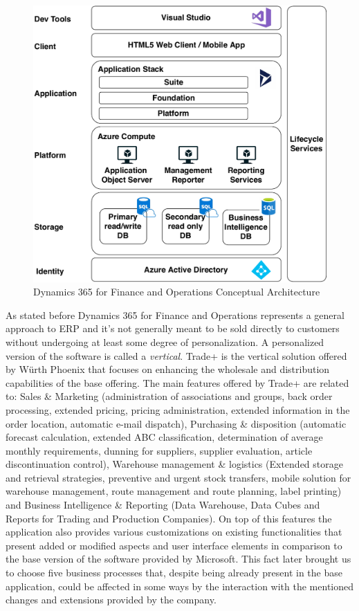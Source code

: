 \begin{figure}[ht]
	\centering
	\includegraphics[scale=0.53]{Images/D365Architecture.pdf}
	\caption{Dynamics 365 for Finance and Operations Conceptual Architecture}
	\label{fig:D365Architecture}
\end{figure}

As stated before Dynamics 365 for Finance and Operations represents a general approach to ERP and it's not generally meant to be sold directly to customers without undergoing at least some degree of personalization. A personalized version of the software is called a \textit{vertical}. Trade+ is the vertical solution offered by Würth Phoenix that focuses on enhancing the wholesale and distribution capabilities of the base offering. The main features offered by Trade+ are related to: 
Sales \& Marketing (administration of associations and groups, back order processing, extended pricing, pricing administration, extended information in the order location, automatic e-mail dispatch), Purchasing \& disposition (automatic forecast calculation, extended ABC classification, determination of average monthly requirements, dunning for suppliers, supplier evaluation, article discontinuation control), Warehouse management \& logistics (Extended storage and retrieval strategies, preventive and urgent stock transfers, mobile solution for warehouse management, route management and route planning, label printing) and Business Intelligence \& Reporting (Data Warehouse, Data Cubes and Reports for Trading and Production Companies).
On top of this features the application also provides various customizations on existing functionalities that present added or modified aspects and user interface elements in comparison to the base version of the software provided by Microsoft. This fact later brought us to choose five business processes that, despite being already present in the base application, could be affected in some ways by the interaction with the mentioned changes and extensions provided by the company.

